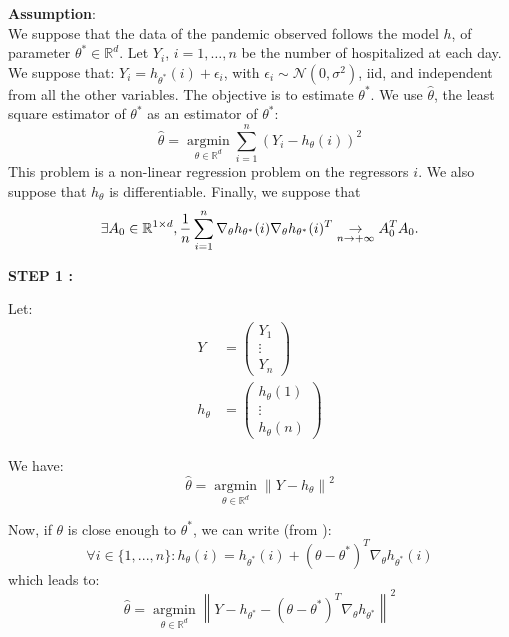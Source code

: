 \textbf{Assumption}:
\\[0.5cm]
We suppose that the data of the pandemic observed follows the model $h$, of parameter $\theta^* \in \mathbb{R}^d$. Let $Y_i$, $ i = 1, \ldots, n$ be the number of hospitalized at each day. We suppose that: $Y_i = h_{\theta ^* } (i) + \epsilon_i$, with $\epsilon_i \sim \mathcal{N}(0, \sigma^2)$, iid, and independent from all the other variables. The objective is to estimate $\theta^*$. We use $\hat{\theta}$, the least square estimator of $\theta^*$ as an estimator of $\theta^* $:
\[
\hat{\theta} =  \underset{\theta \in \mathbb{R}^d}{\operatorname{argmin}} \sum_{i=1}^{n} (Y_i - h_{\theta}(i))^2
\]
This problem is a non-linear regression problem on the regressors $i$. 
We also suppose that $h_\theta$ is differentiable.
Finally, we suppose that 
\begin{equation}
\exists A_0 \in \mathbb{R} ^{1 \times d},  \frac{1}{n} \sum_{i=1}^{n} \nabla_\theta h_{\theta^*}(i) \nabla_\theta h_{\theta^*}(i)^T \underset{n \rightarrow +\infty }{\rightarrow}  A_0^T A_0 .\label{hyp:major}  \\
\end{equation}

\textbf{STEP 1 :}\\
\label{step:step1}

Let:
\begin{align*}
Y &= \begin{pmatrix}
Y_1 \\
\vdots \\
Y_n
\end{pmatrix} \\
h_\theta &= \begin{pmatrix}
h_\theta(1) \\
\vdots \\
h_\theta(n)
\end{pmatrix}
\end{align*}

We have:
\[
\hat{\theta} =  \underset{\theta \in \mathbb{R}^d}{\operatorname{argmin}}  \left\lVert Y - h_\theta \right\rVert ^2
\]

Now, if $\theta$ is close enough to $\theta^*$, we can write (from \cite{ruckstuhl2010introduction}):
\[
\forall i \in \{ 1, ..., n\} :  h_\theta(i) = h_{\theta^*} (i) + (\theta - \theta^*)^T\nabla_\theta h_{\theta^*}(i) 
\]
which leads to:
\[
\hat{\theta} =  \underset{\theta \in \mathbb{R}^d}{\operatorname{argmin}}  \left\lVert Y - h_{\theta^*}  - (\theta - \theta^*)^T\nabla_\theta h_{\theta^*}\right\rVert ^2
\]

